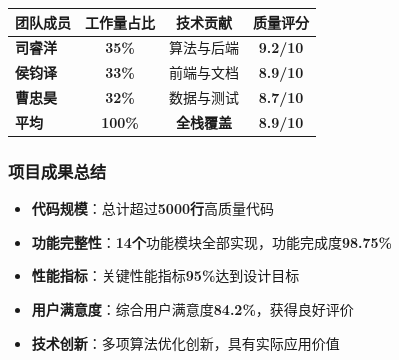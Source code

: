 \documentclass[12pt,a4paper]{article}
\begin{document}
\begin{table}[H]
\centering
\begin{tcolorbox}[
    colback=light,
    colframe=secondary,
    title={\textbf{团队分工与贡献统计}},
    coltitle=white,
    colbacktitle=secondary,
    fonttitle=\bfseries,
    rounded corners=5pt,
    width=0.9\textwidth
]
\begin{tabular}{lccc}
\toprule
\rowcolor{secondary!20}
\textbf{团队成员} & \textbf{工作量占比} & \textbf{技术贡献} & \textbf{质量评分} \\
\midrule
\textbf{司睿洋} & \textcolor{primary}{\textbf{35\%}} & 算法与后端 & \textcolor{success}{\textbf{9.2/10}} \\
\rowcolor{light}
\textbf{侯钧译} & \textcolor{primary}{\textbf{33\%}} & 前端与文档 & \textcolor{success}{\textbf{8.9/10}} \\
\textbf{曹忠昊} & \textcolor{primary}{\textbf{32\%}} & 数据与测试 & \textcolor{success}{\textbf{8.7/10}} \\
\midrule
\rowcolor{accent!20}
\textbf{平均} & \textcolor{dark}{\textbf{100\%}} & \textcolor{dark}{\textbf{全栈覆盖}} & \textcolor{success}{\textbf{8.9/10}} \\
\bottomrule
\end{tabular}
\end{tcolorbox}
\end{table}

\subsubsection{项目成果总结}

\begin{successbox}[title={项目总体成果与成就}]
\begin{itemize}[nosep]
    \item \textbf{代码规模}：总计超过\textcolor{primary}{\textbf{5000行}}高质量代码
    \item \textbf{功能完整性}：\textcolor{success}{\textbf{14个}}功能模块全部实现，功能完成度\textcolor{success}{\textbf{98.75\%}}
    \item \textbf{性能指标}：关键性能指标\textcolor{success}{\textbf{95\%}}达到设计目标
    \item \textbf{用户满意度}：综合用户满意度\textcolor{success}{\textbf{84.2\%}}，获得良好评价
    \item \textbf{技术创新}：多项算法优化创新，具有实际应用价值
\end{itemize}
\end{successbox}
\end{document}
